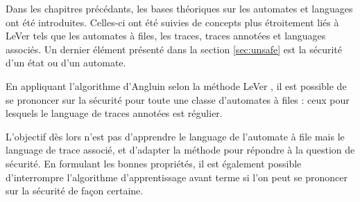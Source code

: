 Dans les chapitres précédants, les bases théoriques sur les automates et languages ont été introduites. Celles-ci ont été suivies de concepts plus étroitement liés à LeVer tels que les automates à files, les traces, traces annotées et languages associés. Un dernier élément présenté dans la section \ref{sec:unsafe} est la sécurité d'un état ou d'un automate.

En appliquant l'algorithme d'Angluin \cite{Angluin87} selon la méthode LeVer \cite{Vardhan04}, il est possible de se prononcer sur la sécurité pour toute une classe d'automates à files : ceux pour lesquels le language de traces annotées est régulier.

L'objectif dès lors n'est pas d'apprendre le language de l'automate à file mais le language de trace associé, et d'adapter la méthode pour répondre à la question de sécurité. En formulant les bonnes propriétés, il est également possible d'interrompre l'algorithme d'apprentissage avant terme si l'on peut se prononcer sur la sécurité de façon certaine.


